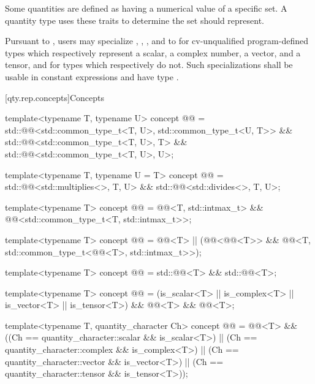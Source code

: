 \begin{itemdescr}
\pnum
Some quantities are defined as having a numerical value of a specific set.
A quantity type  uses these traits
to determine the set  should represent.

\pnum
\remarks
Pursuant to ,
users may specialize , , , and  to 
for cv-unqualified program-defined types
which respectively represent
a scalar,
a complex number,
a vector, and
a tensor,
and  for types which respectively do not.
Such specializations shall be usable in constant expressions
and have type .
\end{itemdescr}

[qty.rep.concepts]{Concepts}

\begin{itemdecl}
template<typename T, typename U>
concept @@ = std::@@<std::common_type_t<T, U>, std::common_type_t<U, T>> &&
                         std::@@<std::common_type_t<T, U>, T> &&
                         std::@@<std::common_type_t<T, U>, U>;

template<typename T, typename U = T>
concept @@ = std::@@<std::multiplies<>, T, U> &&
                         std::@@<std::divides<>, T, U>;

template<typename T>
concept @@ =
  @@<T, std::intmax_t> && @@<std::common_type_t<T, std::intmax_t>>;

template<typename T>
concept @@ =
  @@<T> ||
  (@@<@@<T>> &&
   @@<T, std::common_type_t<@@<T>, std::intmax_t>>);

template<typename T>
concept @@ = std::@@<T> && std::@@<T>;

template<typename T>
concept @@ = (is_scalar<T> || is_complex<T> || is_vector<T> || is_tensor<T>) &&
                         @@<T> && @@<T>;

template<typename T, quantity_character Ch>
concept @@ =
  @@<T> && ((Ch == quantity_character::scalar && is_scalar<T>) ||
                        (Ch == quantity_character::complex && is_complex<T>) ||
                        (Ch == quantity_character::vector && is_vector<T>) ||
                        (Ch == quantity_character::tensor && is_tensor<T>));
\end{itemdecl}

